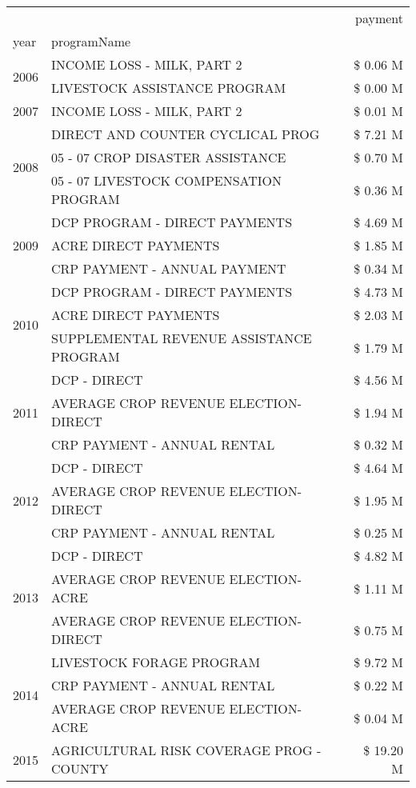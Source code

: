 \begin{tabular}{llr}
\toprule
 &  & payment \\
year & programName &  \\
\midrule
\multirow[t]{2}{*}{2006} & INCOME LOSS - MILK, PART 2 & \$ 0.06 M \\
 & LIVESTOCK ASSISTANCE PROGRAM & \$ 0.00 M \\
\cline{1-3}
2007 & INCOME LOSS - MILK, PART 2 & \$ 0.01 M \\
\cline{1-3}
\multirow[t]{3}{*}{2008} & DIRECT AND COUNTER CYCLICAL PROG & \$ 7.21 M \\
 & 05 - 07 CROP DISASTER ASSISTANCE & \$ 0.70 M \\
 & 05 - 07 LIVESTOCK COMPENSATION PROGRAM & \$ 0.36 M \\
\cline{1-3}
\multirow[t]{3}{*}{2009} & DCP PROGRAM - DIRECT PAYMENTS & \$ 4.69 M \\
 & ACRE DIRECT PAYMENTS & \$ 1.85 M \\
 & CRP PAYMENT - ANNUAL PAYMENT & \$ 0.34 M \\
\cline{1-3}
\multirow[t]{3}{*}{2010} & DCP PROGRAM - DIRECT PAYMENTS & \$ 4.73 M \\
 & ACRE DIRECT PAYMENTS & \$ 2.03 M \\
 & SUPPLEMENTAL REVENUE ASSISTANCE PROGRAM & \$ 1.79 M \\
\cline{1-3}
\multirow[t]{3}{*}{2011} & DCP - DIRECT & \$ 4.56 M \\
 & AVERAGE CROP REVENUE ELECTION-DIRECT & \$ 1.94 M \\
 & CRP PAYMENT - ANNUAL RENTAL & \$ 0.32 M \\
\cline{1-3}
\multirow[t]{3}{*}{2012} & DCP - DIRECT & \$ 4.64 M \\
 & AVERAGE CROP REVENUE ELECTION-DIRECT & \$ 1.95 M \\
 & CRP PAYMENT - ANNUAL RENTAL & \$ 0.25 M \\
\cline{1-3}
\multirow[t]{3}{*}{2013} & DCP - DIRECT & \$ 4.82 M \\
 & AVERAGE CROP REVENUE ELECTION-ACRE & \$ 1.11 M \\
 & AVERAGE CROP REVENUE ELECTION-DIRECT & \$ 0.75 M \\
\cline{1-3}
\multirow[t]{3}{*}{2014} & LIVESTOCK FORAGE PROGRAM & \$ 9.72 M \\
 & CRP PAYMENT - ANNUAL RENTAL & \$ 0.22 M \\
 & AVERAGE CROP REVENUE ELECTION-ACRE & \$ 0.04 M \\
\cline{1-3}
\multirow[t]{3}{*}{2015} & AGRICULTURAL RISK COVERAGE PROG - COUNTY & \$ 19.20 M \\

\end{tabular}
